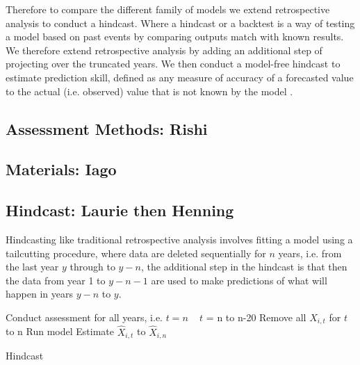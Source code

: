 \documentclass[a4paper]{article}
\begin{document}
Therefore to compare the different family of models we extend retrospective analysis to conduct a hindcast. Where a hindcast or a backtest is a way of testing a model based on past events by comparing outputs match with known results. We therefore extend retrospective analysis by adding an additional step of projecting over the truncated years. We then conduct a model-free hindcast \cite{kell2016xval} to estimate prediction skill, defined as any measure of accuracy of a forecasted value to the actual (i.e. observed) value that is not known by the model \citep{glickman2000glossary}. 

\subsection{Assessment Methods: Rishi}


\subsection{Materials: Iago}


\subsection{Hindcast: Laurie then Henning}

Hindcasting like traditional retrospective analysis involves fitting a model using a tailcutting procedure, where data are deleted sequentially for $n$ years, i.e. from the last year $y$ through to $y−n$, the additional step in the hindcast is that then the data from year 1 to $y−n−1$ are used to make predictions of what will happen in years $y−n$ to $y$.

\begin{algorithm}[!ht]
\begin{algorithmic}[1]

\State Conduct assessment for all years, i.e. $t=n$
\For ~ $t$ = n to n-20
\State Remove all $X_{i,t}$ for $t$ to n
\State Run model
\State Estimate $\hat{X}_{i,t}$ to $\hat{X}_{i,n}$ 
\EndFor
\caption{Hindcast~\citep{kell2016xval}}
\label{Hindcast}
\end{algorithmic}
\end{algorithm}
\end{document}
